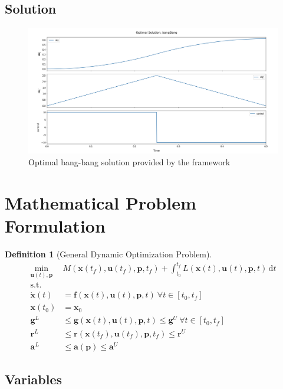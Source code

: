 \documentclass[12pt]{article}
\newtheorem{definition}{Definition}
\renewcommand{\v}{\bm}
\begin{document}
\subsection{Solution}

\begin{figure}[H]
	\centering
	\includegraphics[width=\textwidth]{images/bangBang.png}
	\caption{Optimal bang-bang solution provided by the framework}
	\label{fig:bangBang}
\end{figure}

\section{Mathematical Problem Formulation}
\label{c:GDOP}
\begin{definition}[General Dynamic Optimization Problem]
	\begin{align*}
		\min_{\v{u}(t), \v{p}} ~ & M(\v{x}(t_f), \v{u}(t_f),
		\v{p}, t_f) + \int_{t_0}^{t_f} L(\v{x}(t), \v{u}(t), \v{p}, t)
		\, \mathrm{d}t
		\\
		\text{s.t.}              &
		\\
		\dot{\v{x}}(t)           & = \v{f}(\v{x}(t), \v{u}(t), \v{p},
		t)\
		\forall t \in [t_0, t_f]
		\\
		\v{x}(t_0)               & = \v{x}_0
		\\
		\v{g}^{L}                & \leq \v{g}(\v{x}(t), \v{u}(t),
		\v{p}, t)
		\leq \v{g}^{U}\ \forall t \in [t_0, t_f]
		\\
		\v{r}^{L}                & \leq \v{r}(\v{x}(t_f), \v{u}(t_f),
		\v{p},
		t_f) \leq \v{r}^{U}
		\\
		\v{a}^{L}                & \leq \v{a}(\v{p}) \leq \v{a}^{U}
	\end{align*}
\end{definition}

\subsection{Variables}
\end{document}
